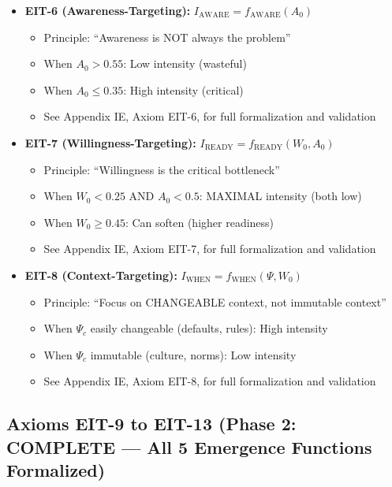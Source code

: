 \begin{itemize}[nosep]
\item \textbf{EIT-6 (Awareness-Targeting):} $I_{\text{AWARE}} = f_{\text{AWARE}}(A_0)$
  \begin{itemize}
  \item Principle: ``Awareness is NOT always the problem''
  \item When $A_0 > 0.55$: Low intensity (wasteful)
  \item When $A_0 \leq 0.35$: High intensity (critical)
  \item See Appendix IE, Axiom EIT-6, for full formalization and validation
  \end{itemize}

\item \textbf{EIT-7 (Willingness-Targeting):} $I_{\text{READY}} = f_{\text{READY}}(W_0, A_0)$
  \begin{itemize}
  \item Principle: ``Willingness is the critical bottleneck''
  \item When $W_0 < 0.25$ AND $A_0 < 0.5$: MAXIMAL intensity (both low)
  \item When $W_0 \geq 0.45$: Can soften (higher readiness)
  \item See Appendix IE, Axiom EIT-7, for full formalization and validation
  \end{itemize}

\item \textbf{EIT-8 (Context-Targeting):} $I_{\text{WHEN}} = f_{\text{WHEN}}(\Psi, W_0)$
  \begin{itemize}
  \item Principle: ``Focus on CHANGEABLE context, not immutable context''
  \item When $\Psi_c$ easily changeable (defaults, rules): High intensity
  \item When $\Psi_c$ immutable (culture, norms): Low intensity
  \item See Appendix IE, Axiom EIT-8, for full formalization and validation
  \end{itemize}
\end{itemize}

\subsection{Axioms EIT-9 to EIT-13 (Phase 2: COMPLETE — All 5 Emergence Functions Formalized)}

